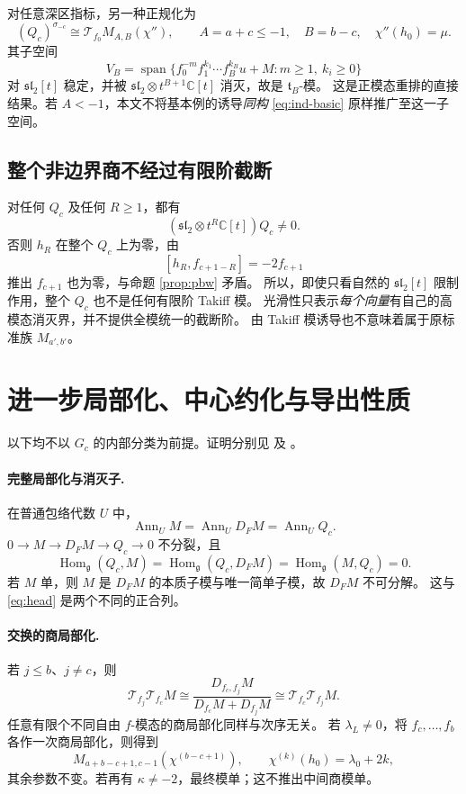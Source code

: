 \documentclass[UTF8,11pt,a4paper,fontset=fandol]{ctexart}
\theoremstyle{upright}
\newcommand{\C}{\mathbb C}
\newcommand{\g}{\mathfrak g}
\newcommand{\slc}{\mathfrak{sl}_2}
\newcommand{\T}{\mathcal T}
\DeclareMathOperator{\Span}{span}
\DeclareMathOperator{\Ann}{Ann}
\DeclareMathOperator{\Hom}{Hom}
\begin{document}
对任意深区指标，另一种正规化为
\[
(Q_c)^{\sigma_{-c}}\cong\T_{f_0}M_{A,B}(\chi''),\qquad
A=a+c\le-1,\quad B=b-c,\quad \chi''(h_0)=\mu.
\]
其子空间
\[
V_B=\Span\{f_0^{-m}f_1^{k_1}\cdots f_B^{k_B}u+M:m\ge1,\ k_i\ge0\}
\]
对 $\slc[t]$ 稳定，并被 $\slc\otimes t^{B+1}\C[t]$ 消灭，故是 $\mathfrak t_B$-模。
这是正模态重排的直接结果。若 $A<-1$，本文不将基本例的诱导\emph{同构}
\eqref{eq:ind-basic} 原样推广至这一子空间。

\subsection{整个非边界商不经过有限阶截断}
对任何 $Q_c$ 及任何 $R\ge1$，都有
\begin{equation}\label{eq:no-truncation}
(\slc\otimes t^R\C[t])Q_c\ne0.
\end{equation}
否则 $h_R$ 在整个 $Q_c$ 上为零，由
\[
[h_R,f_{c+1-R}]=-2f_{c+1}
\]
推出 $f_{c+1}$ 也为零，与命题 \ref{prop:pbw} 矛盾。
所以，即使只看自然的 $\slc[t]$ 限制作用，整个 $Q_c$ 也不是任何有限阶 Takiff 模。
光滑性只表示\emph{每个向量}有自己的高模态消灭界，并不提供全模统一的截断阶。
由 Takiff 模诱导也不意味着属于原标准族 $M_{a',b'}$。

\section{进一步局部化、中心约化与导出性质}

以下均不以 $G_c$ 的内部分类为前提。证明分别见 \cite[Sections 8--10]{Unified}
及 \cite[Section 5]{Addendum}。

\paragraph{完整局部化与消灭子.}
在普通包络代数 $U$ 中，
\[
\Ann_U M=\Ann_U D_FM=\Ann_U Q_c.
\]
$0\to M\to D_FM\to Q_c\to0$ 不分裂，且
\[
\Hom_\g(Q_c,M)=\Hom_\g(Q_c,D_FM)=\Hom_\g(M,Q_c)=0.
\]
若 $M$ 单，则 $M$ 是 $D_FM$ 的本质子模与唯一简单子模，故 $D_FM$ 不可分解。
这与 \eqref{eq:head} 是两个不同的正合列。

\paragraph{交换的商局部化.}
若 $j\le b$、$j\ne c$，则
\[
\T_{f_j}\T_{f_c}M\cong
\frac{D_{f_c,f_j}M}{D_{f_c}M+D_{f_j}M}
\cong\T_{f_c}\T_{f_j}M.
\]
任意有限个不同自由 $f$-模态的商局部化同样与次序无关。
若 $\lambda_L\ne0$，将 $f_c,\ldots,f_b$ 各作一次商局部化，则得到
\[
M_{a+b-c+1,c-1}(\chi^{(b-c+1)}),\qquad
\chi^{(k)}(h_0)=\lambda_0+2k,
\]
其余参数不变。若再有 $\kappa\ne-2$，最终模单；这不推出中间商模单。
\end{document}
